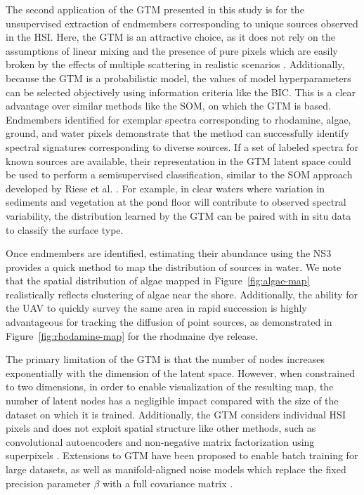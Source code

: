 The second application of the GTM presented in this study is for the
unsupervised extraction of endmembers corresponding to unique sources observed
in the HSI. Here, the GTM is an attractive choice, as it does not rely on the
assumptions of linear mixing and the presence of pure pixels which are easily
broken by the effects of multiple scattering in realistic scenarios
\cite{nonlinearity-in-hsi}. Additionally, because the GTM is a probabilistic
model, the values of model hyperparameters can be selected objectively using
information criteria like the BIC. This is a clear advantage over similar
methods like the SOM, on which the GTM is based. Endmembers identified for
exemplar spectra corresponding to rhodamine, algae, ground, and water pixels
demonstrate that the method can successfully identify spectral signatures
corresponding to diverse sources. If a set of labeled spectra for known sources
are available, their representation in the GTM latent space could be used to
perform a semisupervised classification, similar to the SOM approach developed
by Riese et al. \cite{riese2019supervised}. For example, in clear waters where
variation in sediments and vegetation at the pond floor will contribute to
observed spectral variability, the distribution learned by the GTM can be paired
with in situ data to classify the surface type.


Once endmembers are identified, estimating their abundance using the NS3
provides a quick method to map the distribution of sources in water. We note
that the spatial distribution of algae mapped in Figure~\ref{fig:algae-map}
realistically reflects clustering of algae near the shore. Additionally, the
ability for the UAV to quickly survey the same area in rapid succession is
highly advantageous for tracking the diffusion of point sources, as demonstrated
in Figure~\ref{fig:rhodamine-map} for the rhodmaine dye release.

The primary limitation of the GTM is that the number of nodes increases
exponentially with the dimension of the latent space. However, when constrained
to two dimensions, in order to enable visualization of the resulting map, the
number of latent nodes has a negligible impact compared with the size of the
dataset on which it is trained. Additionally, the GTM considers individual HSI
pixels and does not exploit spatial structure like other methods, such as
convolutional autoencoders and non-negative matrix factorization using
superpixels \cite{palsson2020convolutional,unmixing-nmf-review}. Extensions
to  GTM have been proposed to enable batch training for large datasets, as well
as manifold-aligned noise models which replace the fixed precision parameter
$\beta$ with a full covariance matrix \cite{gtm-developments}.

